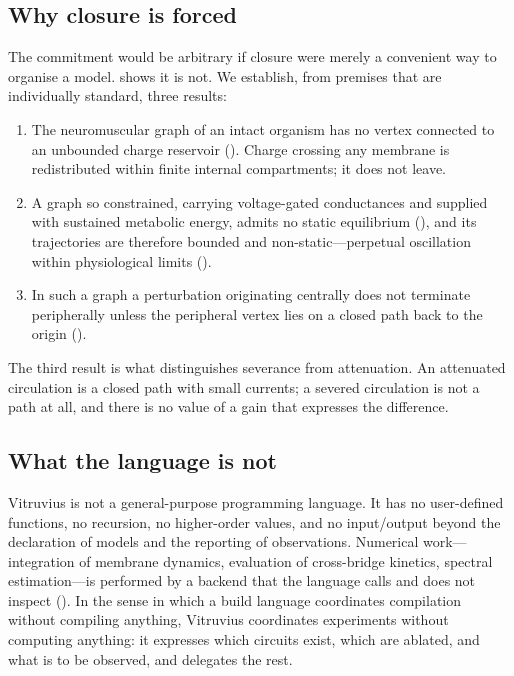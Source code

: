 \documentclass[11pt,twocolumn,a4paper]{article}
\theoremstyle{thmstyle}
\theoremstyle{definition}
\theoremstyle{remark}
\begin{document}
\subsection{Why closure is forced}

The commitment would be arbitrary if closure were merely a convenient way to
organise a model.  shows it is not. We establish, from
premises that are individually standard, three results:

\begin{enumerate}[leftmargin=1.6em,itemsep=2pt]
\item The neuromuscular graph of an intact organism has no vertex connected to
an unbounded charge reservoir (). Charge crossing any
membrane is redistributed within finite internal compartments; it does not
leave.
\item A graph so constrained, carrying voltage-gated conductances and supplied
with sustained metabolic energy, admits no static equilibrium
(), and its trajectories are therefore bounded and
non-static---perpetual oscillation within physiological limits
().
\item In such a graph a perturbation originating centrally does not terminate
peripherally unless the peripheral vertex lies on a closed path back to the
origin ().
\end{enumerate}

The third result is what distinguishes severance from attenuation. An
attenuated circulation is a closed path with small currents; a severed
circulation is not a path at all, and there is no value of a gain that
expresses the difference.

\subsection{What the language is not}

Vitruvius is not a general-purpose programming language. It has no
user-defined functions, no recursion, no higher-order values, and no
input/output beyond the declaration of models and the reporting of
observations. Numerical work---integration of membrane dynamics, evaluation of
cross-bridge kinetics, spectral estimation---is performed by a backend that
the language calls and does not inspect (). In the sense in
which a build language coordinates compilation without compiling anything,
Vitruvius coordinates experiments without computing anything: it expresses
which circuits exist, which are ablated, and what is to be observed, and
delegates the rest.
\end{document}
